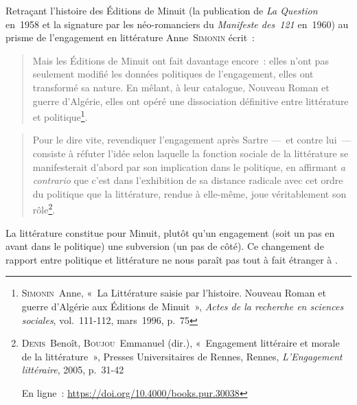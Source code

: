  Retraçant l'histoire des Éditions de Minuit (la publication de \textit{La Question} en~1958 et la signature par les néo-romanciers du \textit{Manifeste des~121} en~1960) au prisme de l'engagement en littérature Anne~\textsc{Simonin} écrit~:
\begin{quote}
    Mais les Éditions de Minuit ont fait davantage encore~: elles n'ont pas seulement modifié les données politiques de l'engagement, elles ont transformé sa nature. En mêlant, à leur catalogue, Nouveau Roman et guerre d'Algérie, elles ont opéré une dissociation définitive entre littérature et politique\footnote{\textsc{Simonin}~Anne, «~La Littérature saisie par l'histoire. Nouveau Roman et guerre d'Algérie aux Éditions de Minuit~»,  \textit{Actes de la recherche en sciences sociales}, vol.~111-112, mars~1996, p.~75}. 
\end{quote}

\begin{quote}
    Pour le dire vite, revendiquer l’engagement après Sartre —~et contre lui~— consiste à réfuter l’idée selon laquelle la fonction sociale de la littérature se manifesterait d’abord par son implication dans le politique, en affirmant \textit{a contrario} que c’est dans l’exhibition de sa distance radicale avec cet ordre du politique que la littérature, rendue à elle-même, joue véritablement son rôle\footnote{\textsc{Denis}~Benoît, \textsc{Boujou}~Emmanuel (dir.), «~Engagement littéraire et morale de la littérature~», Presses Universitaires de Rennes, Rennes, \textit{L'Engagement littéraire}, 2005, p.~31-42
			
			En ligne~: \hyperlink{https://doi.org/10.4000/books.pur.30038}{https://doi.org/10.4000/books.pur.30038}}.
\end{quote}

La littérature constitue pour Minuit, plutôt qu'un engagement (soit un pas en avant dans le politique) une subversion (un pas de côté). Ce changement de rapport entre politique et littérature ne nous paraît pas tout à fait étranger à \punr.

